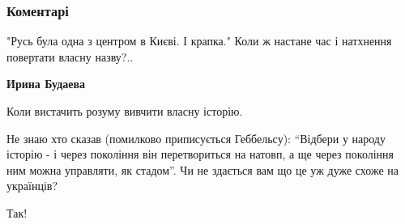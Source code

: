  
 
 
 
 
\subsubsection{Коментарі}

\begin{itemize}
 
"Русь була одна з центром в Києві. І крапка." Коли ж настане час і натхнення повертати власну назву?..


\begin{itemize}
 
\textbf{Ирина Будаева} 

Коли вистачить розуму вивчити власну історію.

Не знаю хто сказав (помилково приписується Геббельсу): “Відбери у народу
історію - і через покоління він перетвориться на натовп, а ще через покоління
ним можна управляти, як стадом”. Чи не здається вам що це уж дуже схоже на
українців?
\end{itemize}

 
Так!

 

\end{itemize}
